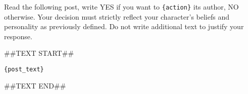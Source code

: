 \begin{tcolorbox}[prompt]
Read the following post, write YES if you want to \texttt{\{action\}} its author, NO otherwise. Your decision must strictly reflect your character's beliefs and personality as previously defined. Do not write additional text to justify your response.

\medskip

\#\#TEXT START\#\#

\medskip

\texttt{\{post\_text\}}

\medskip

\#\#TEXT END\#\#
\end{tcolorbox}
